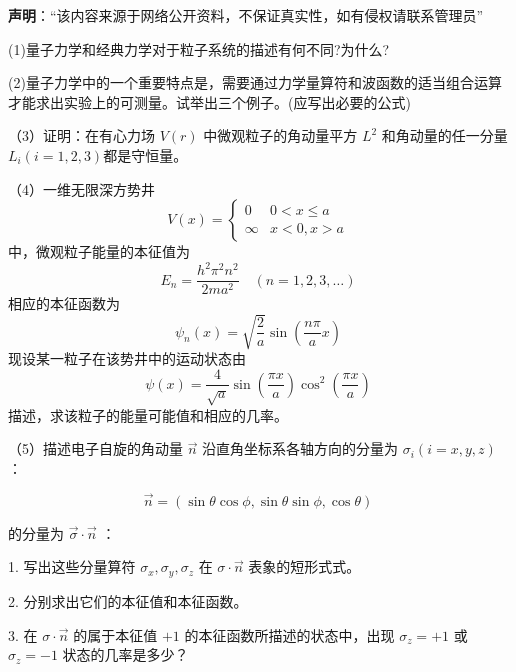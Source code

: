 
\textbf{声明}：“该内容来源于网络公开资料，不保证真实性，如有侵权请联系管理员”

(1)量子力学和经典力学对于粒子系统的描述有何不同?为什么?

(2)量子力学中的一个重要特点是，需要通过力学量算符和波函数的适当组合运算才能求出实验上的可测量。试举出三个例子。(应写出必要的公式)

（3）证明：在有心力场 $V(r)$ 中微观粒子的角动量平方 $ L^2 $ 和角动量的任一分量 $L_i (i=1,2,3)$都是守恒量。

（4）一维无限深方势井
$$V(x) = 
\begin{cases} 
0 & 0 < x \leq a \\
\infty & x < 0, x > a 
\end{cases}~$$
中，微观粒子能量的本征值为
$$E_n = \frac{h^2 \pi^2 n^2}{2ma^2} \quad (n = 1, 2, 3, \ldots)~$$
相应的本征函数为
$$\psi_n(x) = \sqrt{\frac{2}{a}} \sin \left( \frac{n \pi }{a} x \right)~$$
现设某一粒子在该势井中的运动状态由
$$\psi(x) = \frac{4}{\sqrt{a}} \sin \left( \frac{\pi x}{a} \right) \cos^2 \left( \frac{\pi x}{a} \right)~$$
描述，求该粒子的能量可能值和相应的几率。

（5）描述电子自旋的角动量 $\vec{n}$ 沿直角坐标系各轴方向的分量为 $\sigma_i (i=x,y,z)$ ：

$$\vec{n} = (\sin \theta \cos \phi, \sin \theta \sin \phi, \cos \theta)~$$

的分量为 $\vec{\sigma} \cdot \vec{n}$ ：

1. 写出这些分量算符 $\sigma_x, \sigma_y, \sigma_z$ 在 $\sigma \cdot \vec{n}$ 表象的短形式式。

2. 分别求出它们的本征值和本征函数。

3. 在 $\sigma \cdot \vec{n}$ 的属于本征值 $+1$ 的本征函数所描述的状态中，出现 $\sigma_z = +1$ 或 $\sigma_z = -1$ 状态的几率是多少？